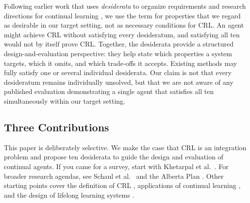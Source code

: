 \documentclass[10pt,journal,compsoc]{IEEEtran}
\begin{document}
Following earlier work that uses \emph{desiderata} to organize requirements and research directions for continual learning \cite{schwarz2018,khetarpal2022,verwimp2024}, we use the term for properties that we regard as desirable in our target setting, not as necessary conditions for CRL.
An agent might achieve CRL without satisfying every desideratum, and satisfying all ten would not by itself prove CRL.
Together, the desiderata provide a structured design-and-evaluation perspective: they help state which properties a system targets, which it omits, and which trade-offs it accepts.
Existing methods may fully satisfy one or several individual desiderata.
Our claim is not that every desideratum remains individually unsolved, but that we are not aware of any published evaluation demonstrating a single agent that satisfies all ten simultaneously within our target setting.

\subsection{Three Contributions}

This paper is deliberately selective.
We make the case that CRL is an integration problem and propose ten desiderata to guide the design and evaluation of continual agents.
If you came for a survey, start with Khetarpal et al.\ \cite{khetarpal2022}.
For broader research agendas, see Schaul et al.\ \cite{schaul2018} and the Alberta Plan \cite{sutton2022}.
Other starting points cover the definition of CRL \cite{abel2023}, applications of continual learning \cite{verwimp2024}, and the design of lifelong learning systems \cite{baker2023}.
\end{document}
